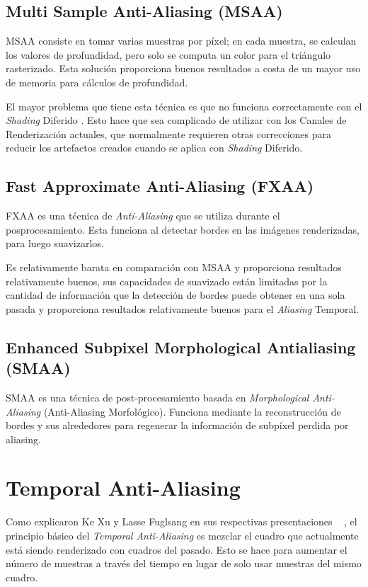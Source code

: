 \documentclass[pregrado]{tesis-usb} %
\begin{document}
\subsection{Multi Sample Anti-Aliasing (MSAA)}
MSAA consiste en tomar varias muestras por píxel; en cada muestra, se calculan los valores de profundidad, pero solo se computa un color para el triángulo rasterizado. Esta solución proporciona buenos resultados a costa de un mayor uso de memoria para cálculos de profundidad.

El mayor problema que tiene esta técnica es que no funciona correctamente con el \textit{Shading} Diferido \cite{Doggett2017EDAN35}. Esto hace que sea complicado de utilizar con los Canales de Renderización actuales, que normalmente requieren otras correcciones para reducir los artefactos creados cuando se aplica con \textit{Shading} Diferido.


\subsection{Fast Approximate Anti-Aliasing (FXAA)}
FXAA es una técnica de \textit{Anti-Aliasing} que se utiliza durante el posprocesamiento. Esta funciona al detectar bordes en las imágenes renderizadas, para luego suavizarlos. \cite{Lottes2009}

Es relativamente barata en comparación con MSAA y proporciona resultados relativamente buenos, sus capacidades de suavizado están limitadas por la cantidad de información que la detección de bordes puede obtener en una sola pasada y proporciona resultados relativamente buenos para el \textit{Aliasing} Temporal.

\subsection{Enhanced Subpixel Morphological Antialiasing (SMAA)}
SMAA es una técnica de post-procesamiento basada en \textit{Morphological Anti-Aliasing} (Anti-Aliasing Morfológico). Funciona mediante la reconstrucción de bordes y sus alrededores para regenerar la información de subpíxel perdida por aliasing. \cite{Jimenez2012}

\section{Temporal Anti-Aliasing}
Como explicaron Ke Xu y Lasse Fuglsang en sus respectivas presentaciones ~ \cite{XU2016, Fuglsand2016}, el principio básico del \textit{Temporal Anti-Aliasing} es mezclar el cuadro que actualmente está siendo renderizado con cuadros del pasado. Esto se hace para aumentar el número de muestras a través del tiempo en lugar de solo usar muestras del mismo cuadro.
\end{document}
